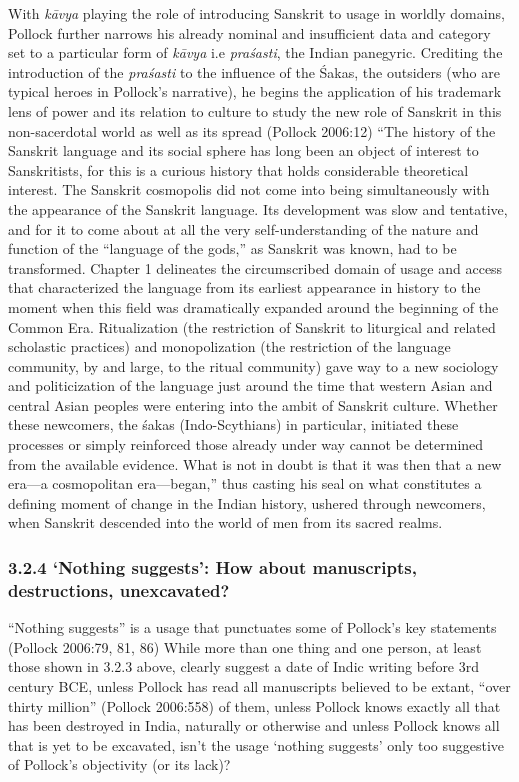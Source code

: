 With \textit{kāvya} playing the role of introducing Sanskrit to usage in worldly domains, Pollock further narrows his already nominal and insufficient data and category set to a particular form of \textit{kāvya} i.e \textit{praśasti}, the Indian panegyric. Crediting the introduction of the \textit{praśasti} to the influence of the Śakas, the outsiders (who are typical heroes in Pollock’s narrative), he begins the application of his trademark lens of power and its relation to culture to study the new role of Sanskrit in this non-sacerdotal world as well as its spread (Pollock 2006:12) “The history of the Sanskrit language and its social sphere has long been an object of interest to Sanskritists, for this is a curious history that holds considerable theoretical interest. The Sanskrit cosmopolis did not come into being simultaneously with the appearance of the Sanskrit language. Its development was slow and tentative, and for it to come about at all the very self-understanding of the nature and function of the “language of the gods,” as Sanskrit was known, had to be transformed. Chapter 1 delineates the circumscribed domain of usage and access that characterized the language from its earliest appearance in history to the moment when this field was dramatically expanded around the beginning of the Common Era. Ritualization (the restriction of Sanskrit to liturgical and related scholastic practices) and monopolization (the restriction of the language community, by and large, to the ritual community) gave way to a new sociology and politicization of the language just around the time that western Asian and central Asian peoples were entering into the ambit of Sanskrit culture. Whether these newcomers, the śakas (Indo-Scythians) in particular, initiated these processes or simply reinforced those already under way cannot be determined from the available evidence. What is not in doubt is that it was then that a new era—a cosmopolitan era—began,” thus casting his seal on what constitutes a defining moment of change in the Indian history, ushered through newcomers, when Sanskrit descended into the world of men from its sacred realms.


\subsubsection*{3.2.4 ‘Nothing suggests’: How about manuscripts, destructions, unexcavated?}

\vskip -7pt

“Nothing suggests” is a usage that punctuates some of Pollock’s key statements (Pollock 2006:79, 81, 86) While more than one thing and one person, at least those shown in 3.2.3 above, clearly suggest a date of Indic writing before 3rd century BCE, unless Pollock has read all manuscripts believed to be extant, “over thirty million” (Pollock 2006:558) of them, unless Pollock knows exactly all that has been destroyed in India, naturally or otherwise and unless Pollock knows all that is yet to be excavated, isn’t the usage ‘nothing suggests’ only too suggestive of Pollock’s objectivity (or its lack)?


